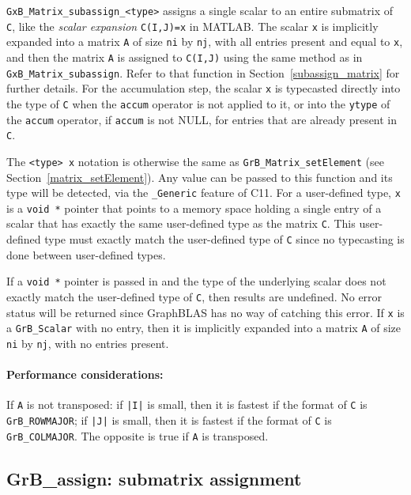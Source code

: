 \documentclass[12pt]{article}
\begin{document}
\verb'GxB_Matrix_subassign_<type>' assigns a single scalar to an entire
submatrix of \verb'C', like the {\em scalar expansion} \verb'C(I,J)=x' in
MATLAB.  The scalar \verb'x' is implicitly expanded into a matrix \verb'A' of
size \verb'ni' by \verb'nj', with all entries present and equal to \verb'x',
and then the matrix \verb'A' is assigned to
\verb'C(I,J)' using the same method as in \verb'GxB_Matrix_subassign'.  Refer
to that function in Section~\ref{subassign_matrix} for further details.
For the accumulation step, the scalar \verb'x' is typecasted directly into the
type of \verb'C' when the \verb'accum' operator is not applied to it, or into
the \verb'ytype' of the \verb'accum' operator, if \verb'accum' is not NULL, for
entries that are already present in \verb'C'.

The \verb'<type> x' notation is otherwise the same as
\verb'GrB_Matrix_setElement' (see Section~\ref{matrix_setElement}).  Any value
can be passed to this function and its type will be detected, via the
\verb'_Generic' feature of C11.  For a user-defined type, \verb'x' is a
\verb'void *' pointer that points to a memory space holding a single entry of a
scalar that has exactly the same user-defined type as the matrix \verb'C'.
This user-defined type must exactly match the user-defined type of \verb'C'
since no typecasting is done between user-defined types.

If a \verb'void *' pointer is passed in and the type of the underlying scalar
does not exactly match the user-defined type of \verb'C', then results are
undefined.  No error status will be returned since GraphBLAS has no way of
catching this error.
If \verb'x' is a \verb'GrB_Scalar' with no entry, then it is implicitly
expanded into a matrix \verb'A' of size \verb'ni' by \verb'nj', with no entries
present.

\paragraph{\bf Performance considerations:} %
If \verb'A' is not transposed: if \verb'|I|' is small, then it is fastest if
the format of \verb'C' is \verb'GrB_ROWMAJOR'; if \verb'|J|' is small, then it is
fastest if the format of \verb'C' is \verb'GrB_COLMAJOR'.  The opposite is true
if \verb'A' is transposed.

\newpage
\subsection{{\sf GrB\_assign:} submatrix assignment} %
\label{assign}
\end{document}
